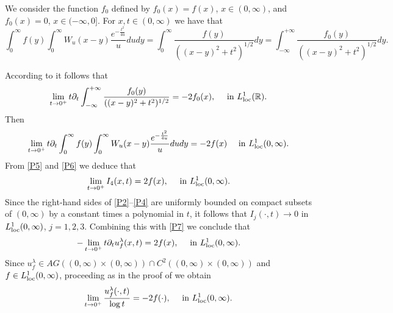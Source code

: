 \documentclass[a4paper,10pt, reqno]{amsart}
\theoremstyle{definition}
\theoremstyle{remark}
\numberwithin{equation}{section}
\begin{document}
We consider the function $f_0$ defined by $f_0(x)=f(x)$, $x\in (0,\infty)$, and $f_0(x)=0$, $x\in (-\infty ,0]$. For $x,t\in (0,\infty)$ we have that 
\[
\int_0^\infty f(y)\int_0^\infty W_u(x-y)\frac{e^{-\frac{t^2}{4u}}}{u}dudy=\int_0^\infty \frac{f(y)}{((x-y)^2+t^2)^{1/2}}dy=\int_{-\infty}^{+\infty }\frac{f_0(y)}{((x-y)^2+t^2)^{1/2}}dy.
\]

According to \cite[Theorem 3.1, (3.22)]{ChHW} it follows that
\[
\lim_{t\rightarrow 0^+}t\partial_t\int_{-\infty }^{+\infty }\frac{f_0(y)}{((x-y)^2+t^2)^{1/2}}=-2f_0(x),\quad \mbox{ in }L^1_{\rm loc}(\mathbb R).
\]
Then
\begin{equation}\label{P6}
\lim_{t\rightarrow 0^+}t\partial_t\int_0^\infty f(y)\int_0^\infty W_u(x-y)\frac{e^{-\frac{t^2}{4u}}}{u}dudy=-2 f(x)\quad \mbox{ in }L^1_{\rm loc}(0,\infty).
\end{equation}
From \eqref{P5} and \eqref{P6} we deduce that
\begin{equation}\label{P7}
\lim_{t\rightarrow 0^+}I_4(x,t)=2 f(x),\quad \mbox{ in }L^1_{\rm loc}(0,\infty).
\end{equation}
Since the right-hand sides of \eqref{P2}--\eqref{P4} are uniformly bounded on compact subsets of $(0,\infty)$ by a constant times a polynomial in $t$, it follows that $I_j(\cdot,t)\to 0$ in $L^1_{\rm loc}(0,\infty)$, $j=1,2,3$. Combining this with \eqref{P7} we conclude that
\[
-\lim_{t\rightarrow 0^+}t\partial_tu_f^\lambda (x,t)=2 f(x),\quad \mbox{ in }L^1_{\rm loc}(0,\infty).
\]
Since $u_f^\lambda\in AG((0,\infty)\times (0,\infty))\cap C^2((0,\infty)\times (0,\infty))$ and $f\in L^1_{\rm loc}(0,\infty)$, proceeding as in the proof of \cite[Lemma 3.6]{ChHW} we obtain
\[
\lim_{t\rightarrow 0^+}\frac{u_f^\lambda (\cdot,t)}{\log t}=-2 f(\cdot),\quad \mbox{ in }L^1_{\rm loc}(0,\infty).
\]
\end{document}
